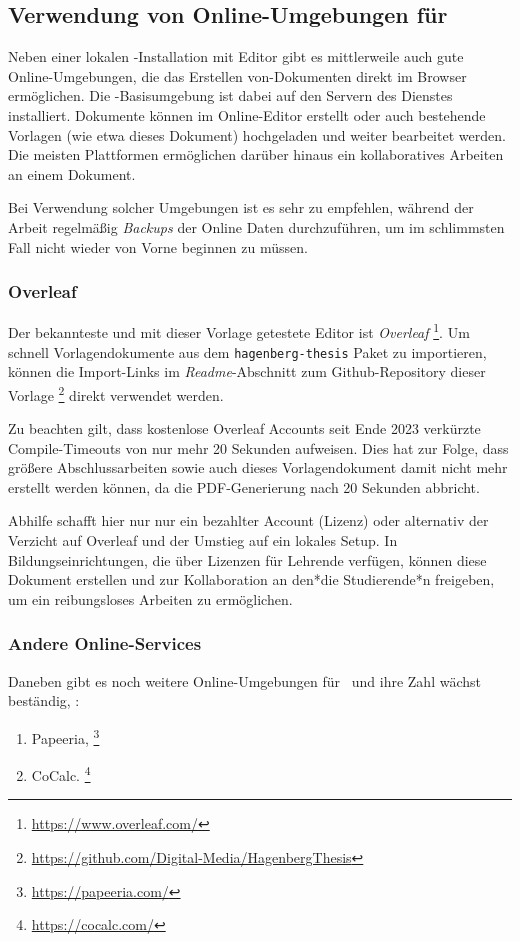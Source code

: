 \subsection{Verwendung von Online-Umgebungen für \latex}

Neben einer lokalen \latex-Installation mit Editor gibt es mittlerweile auch
gute Online-Umgebungen, die das Erstellen von\latex-Dokumenten direkt im Browser
ermöglichen. Die \latex-Basisumgebung ist dabei auf den Servern des Dienstes
installiert. Dokumente können im Online-Editor erstellt oder auch bestehende
Vorlagen (wie etwa dieses Dokument) hochgeladen und weiter bearbeitet werden.
Die meisten Plattformen ermöglichen darüber hinaus ein kollaboratives
Arbeiten an einem Dokument.

Bei Verwendung solcher Umgebungen ist es sehr zu empfehlen, während
der Arbeit regelmäßig \emph{Backups} der Online Daten durchzuführen, um 
im schlimmsten Fall nicht wieder von Vorne beginnen zu müssen.

\subsubsection{Overleaf}

Der bekannteste und mit dieser Vorlage getestete Editor ist \emph{Overleaf}%
\footnote{\url{https://www.overleaf.com/}}.
Um schnell Vorlagendokumente aus dem \texttt{hagenberg-thesis} Paket zu
importieren, können die Im\-port-Links im \emph{Readme}-Abschnitt zum
Github-Repository dieser Vorlage%
\footnote{\url{https://github.com/Digital-Media/HagenbergThesis}}
direkt verwendet werden.

Zu beachten gilt, dass kostenlose Overleaf Accounts seit Ende 2023
verkürzte Com\-pile-Timeouts von nur mehr 20 Sekunden aufweisen. Dies hat zur
Folge, dass größere Abschlussarbeiten sowie auch dieses Vorlagendokument damit
nicht mehr erstellt werden können, da die PDF-Generierung nach 20 Sekunden
abbricht.

Abhilfe schafft hier nur nur ein bezahlter Account (Lizenz) oder alternativ der
Verzicht auf Overleaf und der Umstieg auf ein lokales Setup.
In Bildungseinrichtungen, die über Lizenzen für Lehrende verfügen, können diese
Dokument erstellen und zur Kollaboration an den*die Studierende*n freigeben, um
ein reibungsloses Arbeiten zu ermöglichen.

\subsubsection{Andere Online-Services}

Daneben gibt es noch weitere Online-Umgebungen für \latex\ und ihre Zahl wächst
beständig, \zB:
%
\begin{enumerate}
	\item Papeeria,%
	\footnote{\url{https://papeeria.com/}}
	\item CoCalc.%
	\footnote{\url{https://cocalc.com/}}
\end{enumerate}
